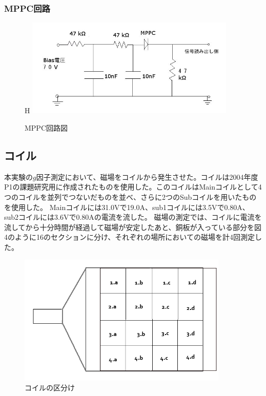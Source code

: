 \subsubsection{MPPC回路}
\begin{figure}{H}
 \centering
 \includegraphics[width=100mm,bb=0 0 ]{MPPC2.jpg}
 \caption{MPPC回路図}
\end{figure}
\subsection{コイル}
  本実験の$g$因子測定において、磁場をコイルから発生させた。コイルは2004年度P1の課題研究用に作成されたものを使用した。このコイルはMainコイルとして4つのコイルを並列でつないだものを並べ、さらに2つのSubコイルを用いたものを使用した。
Mainコイルには31.0Vで19.0A、sub1コイルには3.5Vで0.80A、sub2コイルには3.6Vで0.80Aの電流を流した。
磁場の測定では、コイルに電流を流してから十分時間が経過して磁場が安定したあと、銅板が入っている部分を図4のように16のセクションに分け、それぞれの場所においての磁場を計4回測定した。
\begin{figure}[H]
 \begin{center}
  \includegraphics[width=10cm,bb=0 0 640 500]{coil.jpg}
  \caption{コイルの区分け}
 \end{center}
\end{figure}

